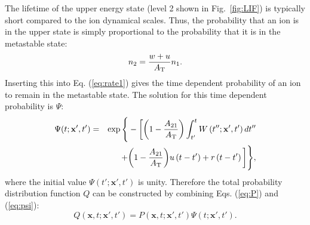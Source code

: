 \documentclass[aip,pop,reprint]{revtex4-1}
\begin{document}
The lifetime of the upper energy state (level 2 shown in Fig.~\ref{fig:LIF}) is typically short compared to the ion dynamical scales. Thus, the probability that an ion is in the upper state is simply proportional to the probability that it is in the metastable state:
\begin{equation}
\label{eq:N2N1}
n_2=\frac{w+u}{A_\textup{T}}n_1.
\end{equation}
Inserting this into Eq. (\ref{eq:rate1}) gives the time dependent probability of an ion to remain in the metastable state. The solution for this time dependent probability is $\Psi$:
\begin{eqnarray}
\label{eq:psi}
\Psi (t;\mathbf{x'},t')=&&\exp \Bigg\{ - \bigg[ \bigg(1-\frac{A_{21}}{A_\textup{T}} \bigg ) \int_{t'}^{t}W \left ( t''; \mathbf{x'},t' \right )dt'' \nonumber \\
&&+\bigg(1-\frac{A_{21}}{A_\textup{T}} \bigg )u\left ( t-t' \right )+r\left ( t-t' \right ) \bigg ] \Bigg \},
\end{eqnarray}
where the initial value $\Psi (t';\mathbf{x'},t')$ is unity. Therefore the total probability distribution function $Q$ can be constructed by combining Eqs. (\ref{eq:P}) and (\ref{eq:psi}):
\begin{equation}
\label{eq:Q}
Q (\mathbf{x},t;\mathbf{x'},t')=P (\mathbf{x},t;\mathbf{x'},t') \Psi (t;\mathbf{x'},t').
\end{equation}
\end{document}

